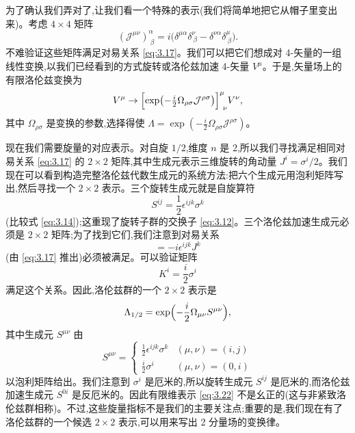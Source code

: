 为了确认我们弄对了,让我们看一个特殊的表示(我们将简单地把它从帽子里变出来)。考虑 $4\times4$ 矩阵
\begin{equation}
  (\mathcal{J}^{\mu\nu})^{\alpha}_{\ \beta} =
    i\bigl( \delta^{\mu\alpha}\delta^{\nu}_{\ \beta}
      - \delta^{\nu\alpha}\delta^{\mu}_{\ \beta} \bigr).
  \label{eq:3.18}
\end{equation}
不难验证这些矩阵满足对易关系 \eqref{eq:3.17}。我们可以把它们想成对 4-矢量的一组线性变换,以我们已经看到的方式旋转或洛伦兹加速 4-矢量 $V^\mu$。于是,矢量场上的有限洛伦兹变换为
\begin{equation}
  V^\mu \to \Bigl[ \exp\bigl(
    -\tfrac{i}{2}\Omega_{\rho\sigma}\mathcal{J}^{\rho\sigma} \bigr)
    \Bigr]^{\mu}_{\ \nu} V^\nu ,
  \label{eq:3.19}
\end{equation}
其中 $\Omega_{\rho\sigma}$ 是变换的参数,选择得使 $\Lambda = \exp(-\frac{i}{2}\Omega_{\rho\sigma}\mathcal{J}^{\rho\sigma})$。

现在我们需要旋量的对应表示。对自旋 $1/2$,维度 $n$ 是 2,所以我们寻找满足相同对易关系 \eqref{eq:3.17} 的 $2\times2$ 矩阵,其中生成元表示三维旋转的角动量 $J^i = \sigma^i/2$。我们现在可以看到构造完整洛伦兹代数生成元的系统方法:把六个生成元用泡利矩阵写出,然后寻找一个 $2\times2$ 表示。三个旋转生成元就是自旋算符
\begin{equation}
  S^{ij} = \frac{1}{2}\epsilon^{ijk}\sigma^k
  \label{eq:3.20}
\end{equation}
(比较式 \eqref{eq:3.14});这重现了旋转子群的交换子 \eqref{eq:3.12}。三个洛伦兹加速生成元必须是 $2\times2$ 矩阵;为了找到它们,我们注意到对易关系
\begin{equation}
  [K^i, K^j] = -i\epsilon^{ijk}J^k
\end{equation}
(由 \eqref{eq:3.17} 推出)必须被满足。可以验证矩阵
\begin{equation}
  K^i = \frac{i}{2}\sigma^i
  \label{eq:3.21}
\end{equation}
满足这个关系。因此,洛伦兹群的一个 $2\times2$ 表示是
\begin{equation}
  \Lambda_{1/2} = \exp\Bigl( -\frac{i}{2}\Omega_{\mu\nu}S^{\mu\nu} \Bigr),
  \label{eq:3.22}
\end{equation}
其中生成元 $S^{\mu\nu}$ 由
\begin{equation}
  S^{\mu\nu} = \begin{cases}
    \frac{1}{2}\epsilon^{ijk}\sigma^k & (\mu,\nu)=(i,j)\\
    \frac{i}{2}\sigma^i & (\mu,\nu)=(0,i)
  \end{cases}
\end{equation}
以泡利矩阵给出。我们注意到 $\sigma^i$ 是厄米的,所以旋转生成元 $S^{ij}$ 是厄米的,而洛伦兹加速生成元 $S^{0i}$ 是反厄米的。因此有限维表示 \eqref{eq:3.22} 不是幺正的(这与非紧致洛伦兹群相称)。不过,这些旋量指标不是我们的主要关注点;重要的是,我们现在有了洛伦兹群的一个候选 $2\times2$ 表示,可以用来写出 2 分量场的变换律。

